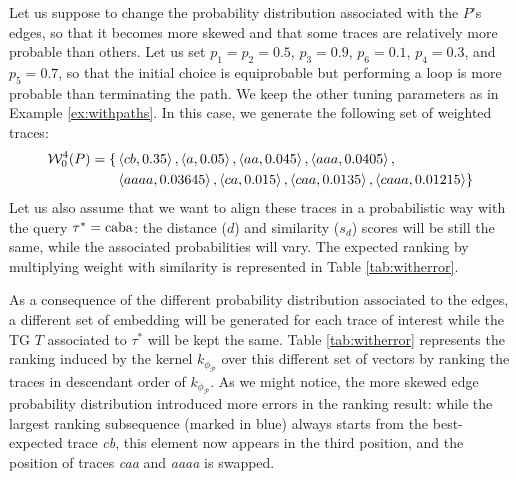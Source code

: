 \begin{example}\label{ex:moreskew}
	Let us suppose to change the probability distribution associated with the $P$'s edges, so that it becomes more skewed and that some traces are relatively more probable than others. Let us set $p_1=p_2=0.5$, $p_3=0.9$, $p_6=0.1$, $p_4=0.3$, and $p_5=0.7$, so that the initial choice is equiprobable but performing a loop is more probable than terminating the path. We keep the other tuning parameters as in Example \ref{ex:withpaths}. In this case, we generate the following set of weighted traces:
$$\begin{aligned}
	\mathcal{W}_0^4(P)=\{&\braket{cb,0.35},\braket{a,0.05},\braket{aa,0.045},\braket{aaa,0.0405},\\
	&\braket{aaaa,0.03645},\braket{ca,0.015},\braket{caa,0.0135},\braket{caaa,0.01215}\}\\
\end{aligned}$$
	Let us also assume that we want to align these traces in a probabilistic way with the query $\tau^*=\textup{caba}$: the distance ($d$) and similarity ($s_d$) scores will be still the same, while the associated probabilities will vary. The expected ranking by multiplying weight with similarity is represented in Table \ref{tab:witherror}. 

As a consequence of the different probability distribution associated to the edges, a different set of embedding will be generated for each trace of interest while the TG $T$ associated to $\tau^*$ will be kept the same. Table \ref{tab:witherror} represents the ranking induced by the kernel $k_{\phi_{\mathcal{P}}}$ over this different set of vectors by ranking the traces in descendant order of $k_{\phi_{\mathcal{P}}}$. As we might notice, the more skewed edge probability distribution introduced more errors in the ranking result: while the largest ranking subsequence (marked in blue) always starts from the best-expected trace \textit{cb}, this element now appears in the third position, and the position of traces \textit{caa} and \textit{aaaa} is swapped.  
 
\end{example}
